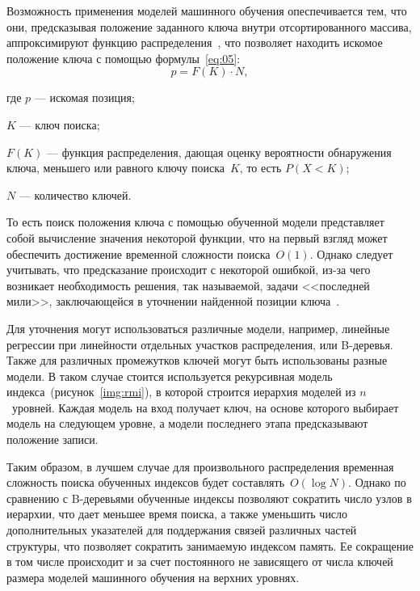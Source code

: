 
Возможность применения моделей машинного обучения опеспечивается тем, что они,
предсказывая положение заданного ключа внутри отсортированного массива,
аппроксимируют функцию распределения~\cite{main}, что позволяет находить искомое
положение ключа с помощью формулы~\eqref{eq:05}:
\begin{equation}\label{eq:05}
    p = F(K) \cdot N,
\end{equation}

где $p$ --- искомая позиция;

$K$ --- ключ поиска;

$F(K)$ --- функция распределения, дающая оценку вероятности обнаружения
ключа, меньшего или равного ключу поиска~$K$, то есть $P(X < K)$;

$N$ --- количество ключей.

То есть поиск положения ключа с помощью обученной модели представляет собой
вычисление значения некоторой функции, что на первый взгляд может обеспечить
достижение временной сложности поиска~$O(1)$. Однако следует
учитывать, что предсказание происходит с некоторой ошибкой, из-за чего возникает
необходимость решения, так называемой, задачи <<последней мили>>, заключающейся
в уточнении найденной позиции ключа~\cite{main}.

Для уточнения могут использоваться различные модели, например, линейные
регрессии при линейности отдельных участков распределения, или B-деревья. Также
для различных промежутков ключей могут быть использованы разные модели. В таком
случае стоится используется рекурсивная модель индекса~(рисунок~\ref{img:rmi}),
в которой строится иерархия моделей из $n$~уровней. Каждая модель на вход
получает ключ, на основе которого выбирает модель на следующем уровне, а модели
последнего этапа предсказывают положение записи.


\vspace{-0.5cm}
Таким образом, в лучшем случае для произвольного распределения временная
сложность поиска обученных индексов будет составлять~$O(\log N)$.  Однако по
сравнению с B-деревьями обученные индексы позволяют сократить число узлов в
иерархии, что дает меньшее время поиска, а также уменьшить число дополнительных
указателей для поддержания связей различных частей структуры, что позволяет
сократить занимаемую индексом память. Ее сокращение в том числе происходит и за
счет постоянного не зависящего от числа ключей размера моделей машинного
обучения на верхних уровнях.

